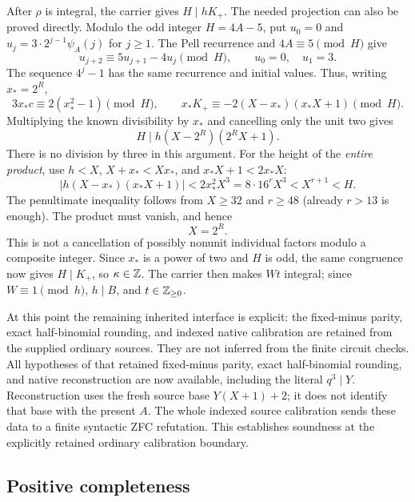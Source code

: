 After \(\rho\) is integral, the carrier gives \(H\mid hK_+\).
The needed projection can also be proved directly.  Modulo the odd
integer \(H=4A-5\), put \(u_0=0\) and
\(u_j=3\cdot2^{j-1}\psi_A(j)\) for \(j\ge1\).
The Pell recurrence and \(4A\equiv5\pmod H\) give
\[
 u_{j+2}\equiv5u_{j+1}-4u_j\pmod H,\qquad u_0=0,\quad u_1=3.
\]
The sequence \(4^j-1\) has the same recurrence and initial values.
Thus, writing \(x_*=2^R\),
\[
 3x_*c\equiv2(x_*^2-1)\pmod H,\qquad
 x_*K_+\equiv-2(X-x_*)(x_*X+1)\pmod H.
\]
Multiplying the known divisibility by \(x_*\) and cancelling only the
unit two gives
\begin{equation}
 H\mid h(X-2^R)(2^RX+1).                         \label{eq:compact-projection}
\end{equation}
There is no division by three in this argument.  For the height of the
\emph{entire product}, use \(h<X\), \(X+x_*<Xx_*\), and
\(x_*X+1<2x_*X\):
\[
 \bigl|h(X-x_*)(x_*X+1)\bigr|
 <2x_*^2X^3=8\cdot16^rX^3<X^{r+1}<H.
\]
The penultimate inequality follows from \(X\ge32\) and \(r\ge48\)
(already \(r>13\) is enough).  The product must vanish, and hence
\begin{equation}
 X=2^R.                                          \label{eq:compact-power}
\end{equation}
This is not a cancellation of possibly nonunit individual factors modulo
a composite integer.  Since \(x_*\) is a power of two and \(H\) is odd,
the same congruence now gives \(H\mid K_+\), so \(\kappa\in\mathbb Z\).
The carrier then makes \(Wt\) integral; since
\(W\equiv1\pmod h\), \(h\mid B\), and \(t\in\mathbb Z_{\ge0}\).

At this point the remaining inherited interface is explicit:
the fixed-minus parity, exact half-binomial rounding, and indexed native
calibration are retained from the supplied ordinary sources.  They are
not inferred from the finite circuit checks.\cite{certificate,native61,indexed}
All hypotheses of that retained fixed-minus parity, exact half-binomial
rounding, and native reconstruction are now available, including the
literal \(q^3\mid Y\).  Reconstruction uses the fresh source base
\(Y(X+1)+2\); it does not identify that base with the present \(A\).
The whole indexed source calibration sends these data to a finite
syntactic ZFC refutation.  This establishes soundness at the explicitly
retained ordinary calibration boundary.

\subsection{Positive completeness}
\label{subsec:compact-completeness}

